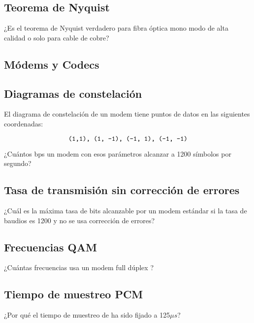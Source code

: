 \documentclass[12pt]{report}
\begin{document}
\begin{exer}
\subsection{Teorema de Nyquist \stwo \steo}
¿Es el teorema de Nyquist verdadero para fibra óptica mono modo de alta calidad o solo para cable de cobre?
\end{exer}

\begin{exer}
\section{Módems y Codecs}
\subsection{Diagramas de constelación \sthree}
El diagrama de constelación de un modem tiene puntos de datos en las siguientes
coordenadas: 

$$ \texttt{(1,1), (1, -1), (-1, 1), (-1, -1)} $$

¿Cuántos bps un modem con esos parámetros alcanzar
a 1200 símbolos por segundo?
\end{exer}

\begin{exer}
\subsection{Tasa de transmisión sin corrección de errores \stwo}
¿Cuál es la máxima tasa de bits alcanzable por un modem estándar  si la tasa de baudios es 1200 y no se usa corrección de errores?
\end{exer}

\begin{exer}
\subsection{Frecuencias QAM \stwo \steo}
¿Cuántas frecuencias usa un modem full dúplex ?
\end{exer}

\begin{exer}
\subsection{Tiempo de muestreo PCM \stwo \steo}
¿Por qué el tiempo de muestreo de  ha sido fijado a 125$\mu s$?
\end{exer}
\end{document}
